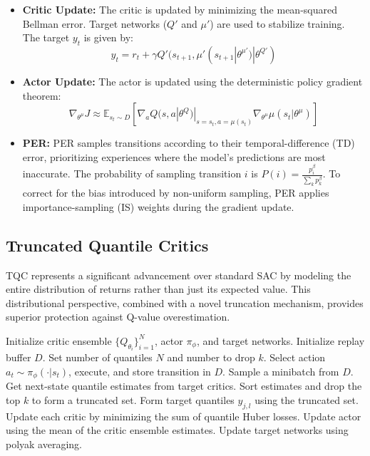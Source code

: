 \begin{itemize}
    \item \textbf{Critic Update:} The critic is updated by minimizing the mean-squared Bellman error. Target networks ($Q'$ and $\mu'$) are used to stabilize training. The target $y_t$ is given by:
    \[
    y_t = r_t + \gamma Q'(s_{t+1}, \mu'(s_{t+1}|\theta^{\mu'})|\theta^{Q'})
    \]
    
    \item \textbf{Actor Update:} The actor is updated using the deterministic policy gradient theorem:
    \[
    \nabla_{\theta^\mu} J \approx \mathbb{E}_{s_t \sim D} [\nabla_a Q(s, a | \theta^Q)|_{s=s_t, a=\mu(s_t)} \nabla_{\theta^\mu} \mu(s_t | \theta^\mu)]
    \]
    
    \item \textbf{PER:} PER samples transitions according to their temporal-difference (TD) error, prioritizing experiences where the model's predictions are most inaccurate. The probability of sampling transition $i$ is $P(i) = \frac{p_i^\beta}{\sum_k p_k^\beta}$. To correct for the bias introduced by non-uniform sampling, PER applies importance-sampling (IS) weights during the gradient update.
\end{itemize}

\subsection{Truncated Quantile Critics}
TQC represents a significant advancement over standard SAC by modeling the entire distribution of returns rather than just its expected value. This distributional perspective, combined with a novel truncation mechanism, provides superior protection against Q-value overestimation.

\begin{algorithm}[H]
\caption{Truncated Quantile Critics (TQC)}
\label{alg:tqc}
\begin{algorithmic}[1]
\State Initialize critic ensemble $\{Q_{\theta_i}\}_{i=1}^N$, actor $\pi_\phi$, and target networks.
\State Initialize replay buffer $D$. Set number of quantiles $N$ and number to drop $k$.
    \State Select action $a_t \sim \pi_\phi(\cdot|s_t)$, execute, and store transition in $D$.
        \State Sample a minibatch from $D$.
        \State Get next-state quantile estimates from target critics.
        \State Sort estimates and drop the top $k$ to form a truncated set.
        \State Form target quantiles $y_{j,l}$ using the truncated set.
        \State Update each critic by minimizing the sum of quantile Huber losses.
        \State Update actor using the mean of the critic ensemble estimates.
        \State Update target networks using polyak averaging.
    \EndIf
\EndFor
\end{algorithmic}
\end{algorithm}

